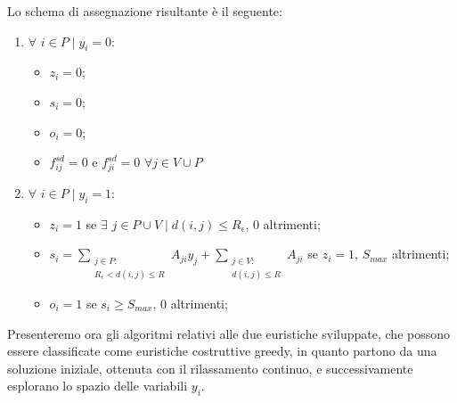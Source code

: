 Lo schema di assegnazione risultante è il seguente: 
\begin{enumerate}
	\item $\forall$ $i \in P \mid y_i = 0$:
	\begin{itemize}
		\item $z_i = 0$;
		\item $s_i = 0$;
		\item $o_i = 0$; 
		\item $f_{ij}^{sd} = 0$ e $f_{ji}^{sd} = 0$    $\forall j \in V \cup P$
	\end{itemize} 
	\item $\forall$ $i \in P \mid y_i = 1$:
	\begin{itemize}
		\item $z_i = 1$ se $\exists$ $j \in P \cup V \mid d(i,j) \leq R_\epsilon$, 0 altrimenti;
		\item $s_i = \sum\limits_{\substack{j \in P :\\ R_{\epsilon} < d(i,j) \le R} } A_{ji} y_{j} + \sum\limits_{\substack{j \in V :\\ d(i,j) \le R }} A_{ji}$ se $z_i = 1$, $S_{max}$ altrimenti;
		\item $o_i = 1$ se $s_i \geq S_{max}$, 0 altrimenti; 
	\end{itemize} 
\end{enumerate} 
Presenteremo ora gli algoritmi relativi alle due euristiche sviluppate, che possono essere classificate come euristiche costruttive greedy, in quanto partono da una soluzione iniziale, ottenuta con il rilassamento continuo, e successivamente esplorano lo spazio delle variabili $y_i$.

